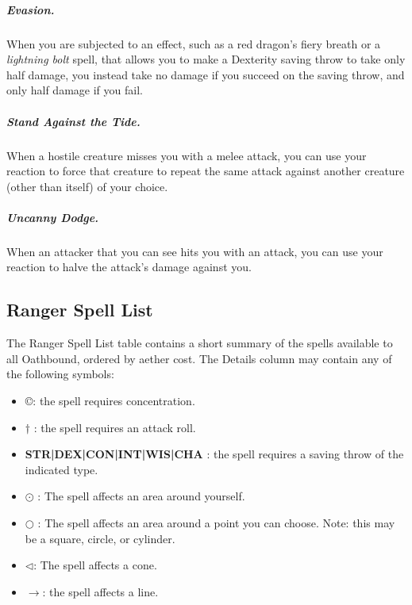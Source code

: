 \subparagraph*{Evasion.} When you are subjected to an effect, such as a red dragon's fiery breath or a \textit{lightning bolt} spell, that allows you to make a Dexterity saving throw to take only half damage, you instead take no damage if you succeed on the saving throw, and only half damage if you fail.

\subparagraph*{Stand Against the Tide.} When a hostile creature misses you with a melee attack, you can use your reaction to force that creature to repeat the same attack against another creature (other than itself) of your choice.

\subparagraph*{Uncanny Dodge.} When an attacker that you can see hits you with an attack, you can use your reaction to halve the attack's damage against you.

\subsection{Ranger Spell List}
The Ranger Spell List table contains a short summary of the spells available to all Oathbound, ordered by aether cost. The Details column may contain any of the following symbols:
\begin{itemize}
	\item \copyright : the spell requires concentration.
	\item $\dagger$ : the spell requires an attack roll.
	\item \textbf{STR|DEX|CON|INT|WIS|CHA} : the spell requires a saving throw of the indicated type.
	\item $\odot$ : The spell affects an area around yourself.
	\item $\bigcirc$ : The spell affects an area around a point you can choose. Note: this may be a square, circle, or cylinder.
	\item $\triangleleft$: The spell affects a cone.
	\item $\rightarrow$: the spell affects a line.
\end{itemize}


